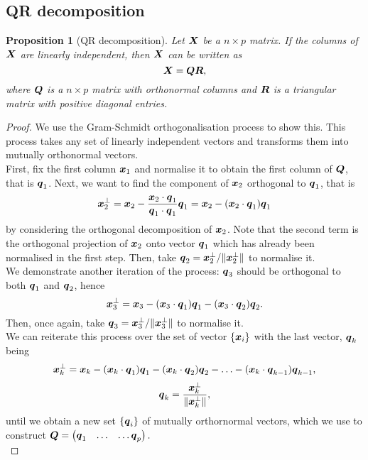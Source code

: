\documentclass[12pt]{article}
\newtheorem{prop}{Proposition}[section]
\begin{document}
	\subsection{QR decomposition\label{sec:qr}}
	\begin{prop}[QR decomposition]
		Let $\boldsymbol{X}$ be a $n\times p$ matrix. If the columns of $\boldsymbol{X}$ are linearly independent, then $\boldsymbol{X}$ can be written as
		$$\boldsymbol{X}=\boldsymbol{Q}\boldsymbol{R},$$
		where $\boldsymbol{Q}$ is a $n\times p$ matrix with orthonormal columns and $\boldsymbol{R}$ is a triangular matrix with positive diagonal entries.
	\end{prop}
	\begin{proof}
		We use the Gram-Schmidt orthogonalisation process \cite{Hefferson2020} to show this. This process takes any set of linearly independent vectors and transforms them into mutually orthonormal vectors.\\
		
		First, fix the first column $\boldsymbol{x}_1$ and normalise it to obtain the first column of $\boldsymbol{Q}$, that is $\boldsymbol{q}_1$. Next, we want to find the component of $\boldsymbol{x}_2$ orthogonal to $\boldsymbol{q}_1$, that is
		\begin{equation}
			\boldsymbol{x}_2^{\perp}=\boldsymbol{x}_2-\frac{\boldsymbol{x}_2\cdot\boldsymbol{q}_1}{\boldsymbol{q}_1\cdot\boldsymbol{q}_1}\boldsymbol{q}_1=\boldsymbol{x}_2-(\boldsymbol{x}_2\cdot\boldsymbol{q}_1)\boldsymbol{q}_1
		\end{equation}
		by considering the orthogonal decomposition of $\boldsymbol{x}_2$. Note that the second term is the orthogonal projection of $\boldsymbol{x}_2$ onto vector $\boldsymbol{q}_1$ which has already been normalised in the first step. Then, take $\boldsymbol{q}_2=\boldsymbol{x}_2^{\perp}/\|\boldsymbol{x}_2^{\perp}\|$ to normalise it.\\
		
		We demonstrate another iteration of the process: $\boldsymbol{q}_3$ should be orthogonal to both $\boldsymbol{q}_1$ and $\boldsymbol{q}_2$, hence
		\begin{equation}
			\boldsymbol{x}^{\perp}_3=\boldsymbol{x}_3-
			(\boldsymbol{x}_3\cdot\boldsymbol{q}_1)\boldsymbol{q}_1-
			(\boldsymbol{x}_3\cdot\boldsymbol{q}_2)\boldsymbol{q}_2.
		\end{equation}
		Then, once again, take $\boldsymbol{q}_3=\boldsymbol{x}_3^{\perp}/\|\boldsymbol{x}_3^{\perp}\|$ to normalise it.\\
		
		We can reiterate this process over the set of vector $\{\boldsymbol{x}_i\}$ with the last vector, $\boldsymbol{q}_k$ being
		\begin{equation}
			\boldsymbol{x}^{\perp}_k=\boldsymbol{x}_k-(\boldsymbol{x}_k\cdot\boldsymbol{q}_1)\boldsymbol{q}_1-
			(\boldsymbol{x}_k\cdot\boldsymbol{q}_2)\boldsymbol{q}_2-\ldots-(\boldsymbol{x}_k\cdot\boldsymbol{q}_{k-1})\boldsymbol{q}_{k-1},
		\end{equation}
		\begin{equation}
			\boldsymbol{q}_k=\frac{\boldsymbol{x}_k^{\perp}}{\|\boldsymbol{x}_k^{\perp}\|},
		\end{equation}
		 until we obtain a new set $\{\boldsymbol{q}_i\}$ of mutually orthornormal vectors, which we use to construct $\boldsymbol{Q}=\begin{pmatrix}
		\boldsymbol{q}_1 & \ldots & \ldots \boldsymbol{q}_p
		\end{pmatrix}.$ \\
		

\end{proof}
\end{document}
